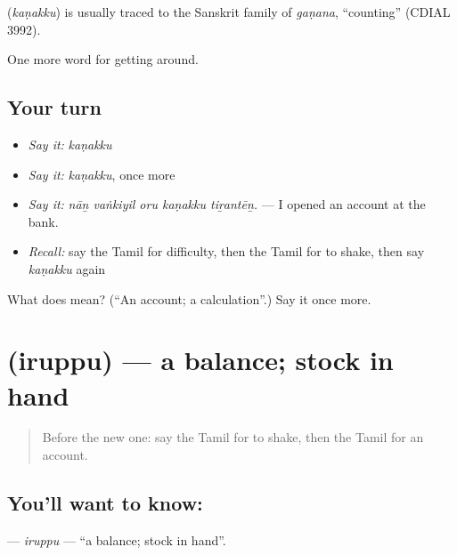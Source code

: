 \begin{cousinweb}
\textbf{} (\emph{kaṇakku}) is usually traced to the Sanskrit family of \emph{gaṇana}, \textquotedblleft{}counting\textquotedblright{} (CDIAL 3992).
\end{cousinweb}

\begin{grammarlens}[title={What you've built}]
One more word for getting around.
\end{grammarlens}

\subsection*{Your turn}
\begin{itemize}
\raggedright
  \item \emph{Say it:} \emph{kaṇakku}
  \item \emph{Say it:} \emph{kaṇakku}, once more
  \item \emph{Say it:} \emph{nāṉ vaṅkiyil oru kaṇakku tiṟantēṉ.} — I opened an account at the bank.
  \item \emph{Recall:} say the Tamil for difficulty, then the Tamil for to shake, then say \emph{kaṇakku} again
\end{itemize}

\begin{tcolorbox}[breakable,colback=teal!4,colframe=teal!35!black,title={Before you move on}]
What does  mean? (\textquotedblleft{}An account; a calculation\textquotedblright{}.) Say it once more.
\end{tcolorbox}
\section[\texorpdfstring{\ta{இருப்பு} (iruppu)}{இருப்பு (iruppu)}]{ (iruppu) — a balance; stock in hand}

\label{lesson:TA-C446-iruppu}



\begin{quote}
Before the new one: say the Tamil for to shake, then the Tamil for an account.
\end{quote}

\subsection*{You'll want to know: }
\textbf{} — \emph{iruppu} — \textquotedblleft{}a balance; stock in hand\textquotedblright{}.

